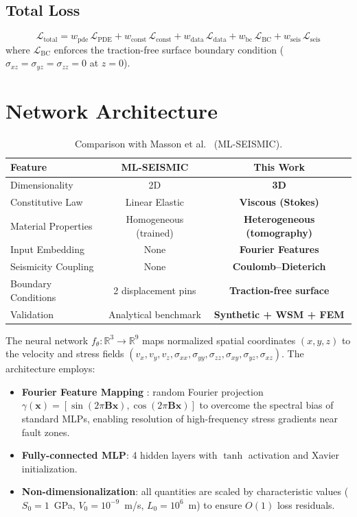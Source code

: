 \documentclass[11pt, a4paper]{article}
\begin{document}
\subsection{Total Loss}
\begin{equation}
    \mathcal{L}_{\text{total}} = w_{\text{pde}}\,\mathcal{L}_{\text{PDE}} + w_{\text{const}}\,\mathcal{L}_{\text{const}} + w_{\text{data}}\,\mathcal{L}_{\text{data}} + w_{\text{bc}}\,\mathcal{L}_{\text{BC}} + w_{\text{seis}}\,\mathcal{L}_{\text{seis}}
    \label{eq:total_loss}
\end{equation}
where $\mathcal{L}_{\text{BC}}$ enforces the traction-free surface boundary condition ($\sigma_{xz} = \sigma_{yz} = \sigma_{zz} = 0$ at $z = 0$).

\section{Network Architecture}

\begin{table}[h!]
\centering
\caption{Comparison with Masson et al.\ \cite{Masson2023} (ML-SEISMIC).}
\begin{tabular}{lcc}
\toprule
\textbf{Feature} & \textbf{ML-SEISMIC} & \textbf{This Work} \\
\midrule
Dimensionality & 2D & \textbf{3D} \\
Constitutive Law & Linear Elastic & \textbf{Viscous (Stokes)} \\
Material Properties & Homogeneous (trained) & \textbf{Heterogeneous (tomography)} \\
Input Embedding & None & \textbf{Fourier Features} \\
Seismicity Coupling & None & \textbf{Coulomb--Dieterich} \\
Boundary Conditions & 2 displacement pins & \textbf{Traction-free surface} \\
Validation & Analytical benchmark & \textbf{Synthetic + WSM + FEM} \\
\bottomrule
\end{tabular}
\label{tab:comparison}
\end{table}

The neural network $f_\theta : \mathbb{R}^3 \to \mathbb{R}^9$ maps normalized spatial coordinates $(x, y, z)$ to the velocity and stress fields $(v_x, v_y, v_z, \sigma_{xx}, \sigma_{yy}, \sigma_{zz}, \sigma_{xy}, \sigma_{yz}, \sigma_{xz})$. The architecture employs:
\begin{itemize}
    \item \textbf{Fourier Feature Mapping} \cite{Tancik2020}: random Fourier projection $\gamma(\mathbf{x}) = [\sin(2\pi\mathbf{B}\mathbf{x}), \cos(2\pi\mathbf{B}\mathbf{x})]$ to overcome the spectral bias of standard MLPs, enabling resolution of high-frequency stress gradients near fault zones.
    \item \textbf{Fully-connected MLP}: 4 hidden layers with $\tanh$ activation and Xavier initialization.
    \item \textbf{Non-dimensionalization}: all quantities are scaled by characteristic values ($S_0 = 1$~GPa, $V_0 = 10^{-9}$~m/s, $L_0 = 10^6$~m) to ensure $O(1)$ loss residuals.
\end{itemize}
\end{document}
